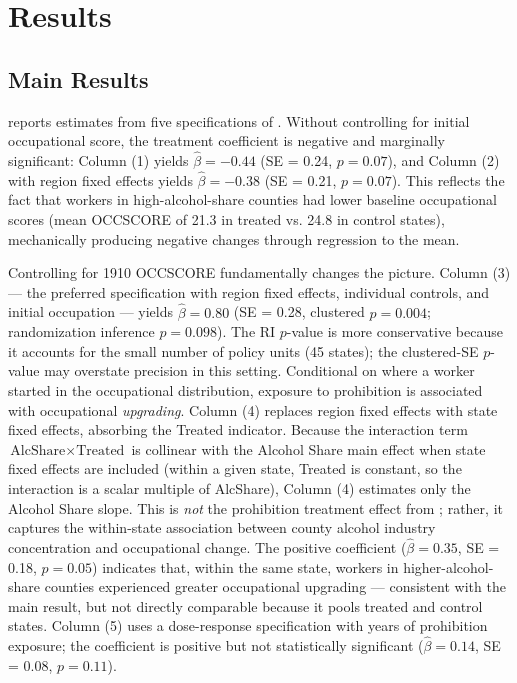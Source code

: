 \documentclass[12pt]{article}
\begin{document}
\section{Results}
\label{sec:results}

\subsection{Main Results}

 reports estimates from five specifications of . Without controlling for initial occupational score, the treatment coefficient is negative and marginally significant: Column (1) yields $\hat{\beta} = -0.44$ (SE = 0.24, $p = 0.07$), and Column (2) with region fixed effects yields $\hat{\beta} = -0.38$ (SE = 0.21, $p = 0.07$). This reflects the fact that workers in high-alcohol-share counties had lower baseline occupational scores (mean OCCSCORE of 21.3 in treated vs. 24.8 in control states), mechanically producing negative changes through regression to the mean.

Controlling for 1910 OCCSCORE fundamentally changes the picture. Column (3) --- the preferred specification with region fixed effects, individual controls, and initial occupation --- yields $\hat{\beta} = 0.80$ (SE = 0.28, clustered $p = 0.004$; randomization inference $p = 0.098$). The RI $p$-value is more conservative because it accounts for the small number of policy units (45 states); the clustered-SE $p$-value may overstate precision in this setting. Conditional on where a worker started in the occupational distribution, exposure to prohibition is associated with occupational \emph{upgrading}. Column (4) replaces region fixed effects with state fixed effects, absorbing the Treated indicator. Because the interaction term $\text{AlcShare} \times \text{Treated}$ is collinear with the Alcohol Share main effect when state fixed effects are included (within a given state, Treated is constant, so the interaction is a scalar multiple of AlcShare), Column (4) estimates only the Alcohol Share slope. This is \emph{not} the prohibition treatment effect from ; rather, it captures the within-state association between county alcohol industry concentration and occupational change. The positive coefficient ($\hat{\beta} = 0.35$, SE = 0.18, $p = 0.05$) indicates that, within the same state, workers in higher-alcohol-share counties experienced greater occupational upgrading --- consistent with the main result, but not directly comparable because it pools treated and control states. Column (5) uses a dose-response specification with years of prohibition exposure; the coefficient is positive but not statistically significant ($\hat{\beta} = 0.14$, SE = 0.08, $p = 0.11$).
\end{document}
